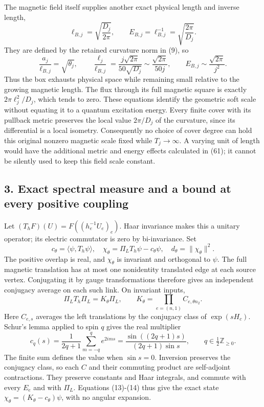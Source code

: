 \documentclass[
  11pt,
]{article}
\begin{document}
The magnetic field itself supplies another exact physical length and
inverse length, \[
 \ell_{B,j}=\sqrt{\frac{D_j}{2\pi}},\qquad
 E_{B,j}=\ell_{B,j}^{-1}=\sqrt{\frac{2\pi}{D_j}}.
\] They are defined by the retained curvature norm in (9), so \[
 \frac{a_j}{\ell_{B,j}}=\sqrt{\theta_j},\qquad
 \frac{\ell_j}{\ell_{B,j}}=\frac{j\sqrt{2\pi}}{50\sqrt{D_j}}
 \sim\frac{\sqrt{2\pi}}{50j},\qquad
 E_{B,j}\sim\frac{\sqrt{2\pi}}{j^2}.
\] Thus the box exhausts physical space while remaining small relative
to the growing magnetic length. The flux through its full magnetic
square is exactly \(2\pi\ell_j^2/D_j\), which tends to zero. These
equations identify the geometric soft scale without equating it to a
quantum excitation energy. Every finite cover with its pullback metric
preserves the local value \(2\pi/D_j\) of the curvature, since its
differential is a local isometry. Consequently no choice of cover degree
can hold this original nonzero magnetic scale fixed while
\(T_j\to\infty\). A varying unit of length would have the additional
metric and energy effects calculated in (61); it cannot be silently used
to keep this field scale constant.

\subsection{3. Exact spectral measure and a bound at every positive
coupling}\label{exact-spectral-measure-and-a-bound-at-every-positive-coupling}

Let \((T_hF)(U)=F((h_e^{-1}U_e)_e)\). Haar invariance makes this a
unitary operator; its electric commutator is zero by bi-invariance. Set
\[
 c_\theta=\langle\psi,T_h\psi\rangle,
 \quad \chi_\theta=\Pi_LT_h\psi-c_\theta\psi,
 \quad d_\theta=\|\chi_\theta\|^2.
\tag{13}
\] The positive overlap is real, and \(\chi_\theta\) is invariant and
orthogonal to \(\psi\). The full magnetic translation has at most one
nonidentity translated edge at each source vertex. Conjugating it by
gauge transformations therefore gives an independent conjugacy average
on each such link. On invariant inputs, \[
 \Pi_LT_h\Pi_L=K_\theta\Pi_L,\qquad
 K_\theta=\prod_{e=(n,1)}C_{e,\theta n_2}.
\tag{14}
\] Here \(C_{e,s}\) averages the left translations by the conjugacy
class of \(\exp(sH_c)\). Schur's lemma applied to spin \(q\) gives the
real multiplier \[
 c_q(s)=\frac1{2q+1}\sum_{m=-q}^q e^{2ims}
 =\frac{\sin((2q+1)s)}{(2q+1)\sin s},\qquad q\in\tfrac12\mathbb Z_{\ge0}.
\tag{15}
\] The finite sum defines the value when \(\sin s=0\). Inversion
preserves the conjugacy class, so each \(C\) and their commuting product
are self-adjoint contractions. They preserve constants and Haar
integrals, and commute with every \(E_e\) and with \(\Pi_L\). Equations
(13)-(14) thus give the exact state
\(\chi_\theta=(K_\theta-c_\theta)\psi\), with no angular expansion.
\end{document}
